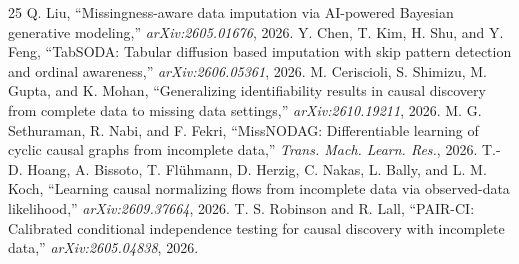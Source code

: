 \documentclass[conference]{IEEEtran}
\begin{document}
\begin{thebibliography}{25}
 Q. Liu, ``Missingness-aware data imputation via AI-powered Bayesian generative modeling,'' \emph{arXiv:2605.01676}, 2026.
 Y. Chen, T. Kim, H. Shu, and Y. Feng, ``TabSODA: Tabular diffusion based imputation with skip pattern detection and ordinal awareness,'' \emph{arXiv:2606.05361}, 2026.
 M. Ceriscioli, S. Shimizu, M. Gupta, and K. Mohan, ``Generalizing identifiability results in causal discovery from complete data to missing data settings,'' \emph{arXiv:2610.19211}, 2026.
 M. G. Sethuraman, R. Nabi, and F. Fekri, ``MissNODAG: Differentiable learning of cyclic causal graphs from incomplete data,'' \emph{Trans. Mach. Learn. Res.}, 2026.
 T.-D. Hoang, A. Bissoto, T. Fl\"uhmann, D. Herzig, C. Nakas, L. Bally, and L. M. Koch, ``Learning causal normalizing flows from incomplete data via observed-data likelihood,'' \emph{arXiv:2609.37664}, 2026.
 T. S. Robinson and R. Lall, ``PAIR-CI: Calibrated conditional independence testing for causal discovery with incomplete data,'' \emph{arXiv:2605.04838}, 2026.
\end{thebibliography}
\end{document}
